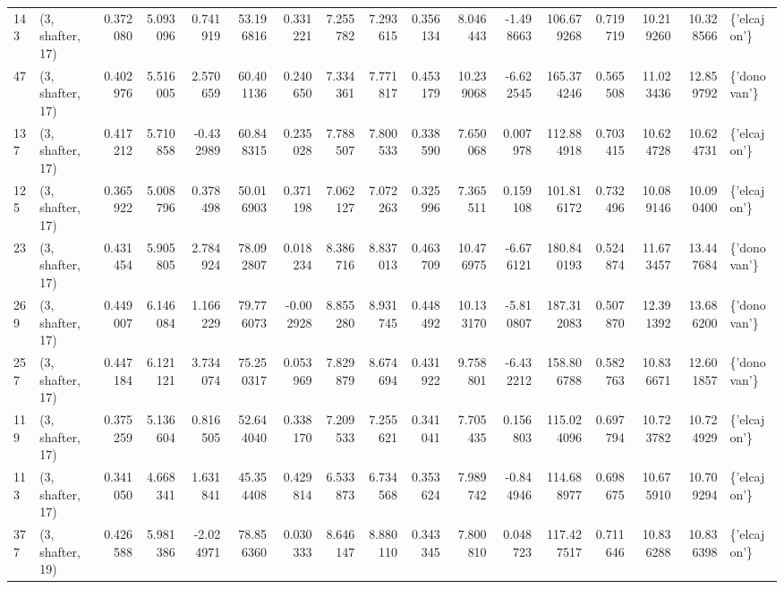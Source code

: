 \begin{tabular}{llrrrrrrrrrrrrrrl}
143 &  (3, shafter, 17) &   0.372080 &   5.093096 &   0.741919 &    53.196816 &   0.331221 &   7.255782 &   7.293615 &  0.356134 &   8.046443 &  -1.498663 &   106.679268 &   0.719719 &  10.219260 &  10.328566 &  \{'elcajon'\} \\
47  &  (3, shafter, 17) &   0.402976 &   5.516005 &   2.570659 &    60.401136 &   0.240650 &   7.334361 &   7.771817 &  0.453179 &  10.239068 &  -6.622545 &   165.374246 &   0.565508 &  11.023436 &  12.859792 &  \{'donovan'\} \\
137 &  (3, shafter, 17) &   0.417212 &   5.710858 &  -0.432989 &    60.848315 &   0.235028 &   7.788507 &   7.800533 &  0.338590 &   7.650068 &   0.007978 &   112.884918 &   0.703415 &  10.624728 &  10.624731 &  \{'elcajon'\} \\
125 &  (3, shafter, 17) &   0.365922 &   5.008796 &   0.378498 &    50.016903 &   0.371198 &   7.062127 &   7.072263 &  0.325996 &   7.365511 &   0.159108 &   101.816172 &   0.732496 &  10.089146 &  10.090400 &  \{'elcajon'\} \\
23  &  (3, shafter, 17) &   0.431454 &   5.905805 &   2.784924 &    78.092807 &   0.018234 &   8.386716 &   8.837013 &  0.463709 &  10.476975 &  -6.676121 &   180.840193 &   0.524874 &  11.673457 &  13.447684 &  \{'donovan'\} \\
269 &  (3, shafter, 17) &   0.449007 &   6.146084 &   1.166229 &    79.776073 &  -0.002928 &   8.855280 &   8.931745 &  0.448492 &  10.133170 &  -5.810807 &   187.312083 &   0.507870 &  12.391392 &  13.686200 &  \{'donovan'\} \\
257 &  (3, shafter, 17) &   0.447184 &   6.121121 &   3.734074 &    75.250317 &   0.053969 &   7.829879 &   8.674694 &  0.431922 &   9.758801 &  -6.432212 &   158.806788 &   0.582763 &  10.836671 &  12.601857 &  \{'donovan'\} \\
119 &  (3, shafter, 17) &   0.375259 &   5.136604 &   0.816505 &    52.644040 &   0.338170 &   7.209533 &   7.255621 &  0.341041 &   7.705435 &   0.156803 &   115.024096 &   0.697794 &  10.723782 &  10.724929 &  \{'elcajon'\} \\
113 &  (3, shafter, 17) &   0.341050 &   4.668341 &   1.631841 &    45.354408 &   0.429814 &   6.533873 &   6.734568 &  0.353624 &   7.989742 &  -0.844946 &   114.688977 &   0.698675 &  10.675910 &  10.709294 &  \{'elcajon'\} \\
377 &  (3, shafter, 19) &   0.426588 &   5.981386 &  -2.024971 &    78.856360 &   0.030333 &   8.646147 &   8.880110 &  0.343345 &   7.800810 &   0.048723 &   117.427517 &   0.711646 &  10.836288 &  10.836398 &  \{'elcajon'\} \\

\end{tabular}
